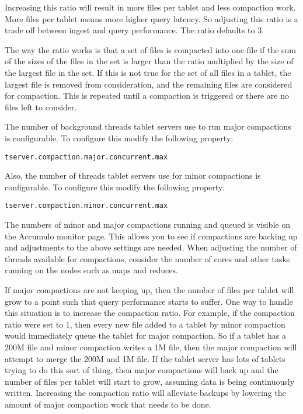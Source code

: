 Increasing this ratio will result in more files per tablet and less compaction
work. More files per tablet means more higher query latency. So adjusting
this ratio is a trade off between ingest and query performance. The ratio
defaults to 3. 

The way the ratio works is that a set of files is compacted into one file if the
sum of the sizes of the files in the set is larger than the ratio multiplied by
the size of the largest file in the set. If this is not true for the set of all
files in a tablet, the largest file is removed from consideration, and the
remaining files are considered for compaction. This is repeated until a
compaction is triggered or there are no files left to consider.

The number of background threads tablet servers use to run major compactions is
configurable. To configure this modify the following property:

\begingroup\fontsize{8pt}{8pt}\selectfont\begin{verbatim}
tserver.compaction.major.concurrent.max
\end{verbatim}\endgroup

Also, the number of threads tablet servers use for minor compactions is
configurable. To configure this modify the following property:

\begingroup\fontsize{8pt}{8pt}\selectfont\begin{verbatim}
tserver.compaction.minor.concurrent.max
\end{verbatim}\endgroup

The numbers of minor and major compactions running and queued is visible on the
Accumulo monitor page. This allows you to see if compactions are backing up
and adjustments to the above settings are needed. When adjusting the number of
threads available for compactions, consider the number of cores and other tasks
running on the nodes such as maps and reduces.

If major compactions are not keeping up, then the number of files per tablet
will grow to a point such that query performance starts to suffer. One way to
handle this situation is to increase the compaction ratio. For example, if the
compaction ratio were set to 1, then every new file added to a tablet by minor
compaction would immediately queue the tablet for major compaction. So if a
tablet has a 200M file and minor compaction writes a 1M file, then the major
compaction will attempt to merge the 200M and 1M file. If the tablet server
has lots of tablets trying to do this sort of thing, then major compactions
will back up and the number of files per tablet will start to grow, assuming
data is being continuously written. Increasing the compaction ratio will
alleviate backups by lowering the amount of major compaction work that needs to
be done.

